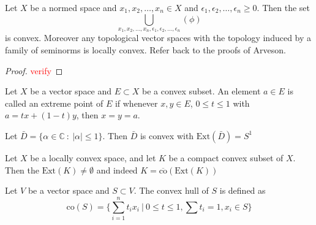 \begin{lemma}
  Let $X$ be a normed space and $x_1 , x_2 , \ldots , x_n \in X$ and
  $\epsilon_1 , \epsilon_2 , \ldots , \epsilon_n \ge 0$. Then the set \[
    \bigcup_{x_1 , x_2 , \ldots , x_n, \epsilon_1 , \epsilon_2 ,
    \ldots , \epsilon_n}(\phi)
  \]
  is convex.
  Moreover any topological vector spaces with the topology induced by
  a family of seminorms is locally convex. Refer back to the proofs of Arveson.
\end{lemma}
\begin{proof}
  \textcolor{red}{verify}
\end{proof}

\begin{definition}
  Let $X$ be a vector space and $E \subset X$ be a convex subset. An
  element $a \in E$ is called an extreme point of $E$ if whenever $x,
  y \in E$, $0 \le t \le 1$ with $a  = tx + (1-t) y$, then $x = y = a$.
\end{definition}
\begin{example}
  Let $\bar{D} = \{ \alpha \in \mathbb{C} \ : \ |\alpha| \le 1 \}$.
  Then $\bar{D}$ is convex with $\textrm{Ext}(\bar{D}) = S^1$
\end{example}

\begin{theorem}
  Let $X$ be a locally convex space, and let $K$ be a compact convex
  subset of $X$. Then the $ \textrm{Ext}(K) \neq \emptyset$ and
  indeed $K = \overline{\textrm{co}}(\textrm{Ext}(K))$
\end{theorem}

\begin{definition}
  Let $V$ be a vector space and $S\subset V$. The convex hull of $S$
  is defined as \[
    \textrm{co}(S) = \Big \{ \sum_{i = 1}^{n} t_i x_i \ \Big| \ 0 \le
    t \le 1, \sum t_i = 1, x_i \in S \Big\}
  \]
\end{definition}


